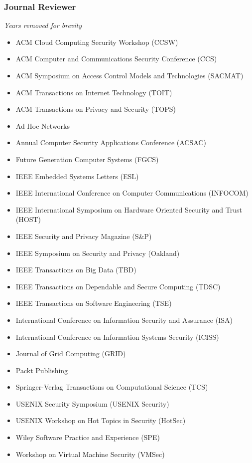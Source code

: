 \hypertarget{journal-reviews}{%
\subsubsection{Journal Reviewer}\label{journal-reviews}}
\small{\textit{Years removed for brevity}}
\begin{itemize}
\tightlist
\item ACM Cloud Computing Security Workshop (CCSW)
\item ACM Computer and Communications Security Conference (CCS)
\item ACM Symposium on Access Control Models and Technologies (SACMAT)
\item ACM Transactions on Internet Technology (TOIT)
\item ACM Transactions on Privacy and Security (TOPS)
\item Ad Hoc Networks
\item Annual Computer Security Applications Conference (ACSAC)
\item Future Generation Computer Systems (FGCS)
\item IEEE Embedded Systems Letters (ESL)
\item IEEE International Conference on Computer Communications (INFOCOM)
\item IEEE International Symposium on Hardware Oriented Security and Trust (HOST)
\item IEEE Security and Privacy Magazine (S\&P)
\item IEEE Symposium on Security and Privacy (Oakland)
\item IEEE Transactions on Big Data (TBD)
\item IEEE Transactions on Dependable and Secure Computing (TDSC)
\item IEEE Transactions on Software Engineering (TSE)
\item International Conference on Information Security and Assurance (ISA)
\item International Conference on Information Systems Security (ICISS)
\item Journal of Grid Computing (GRID)
\item Packt Publishing
\item Springer-Verlag Transactions on Computational Science (TCS)
\item USENIX Security Symposium (USENIX Security)
\item USENIX Workshop on Hot Topics in Security (HotSec)
\item Wiley Software Practice and Experience (SPE)
\item Workshop on Virtual Machine Security (VMSec)
\end{itemize}

